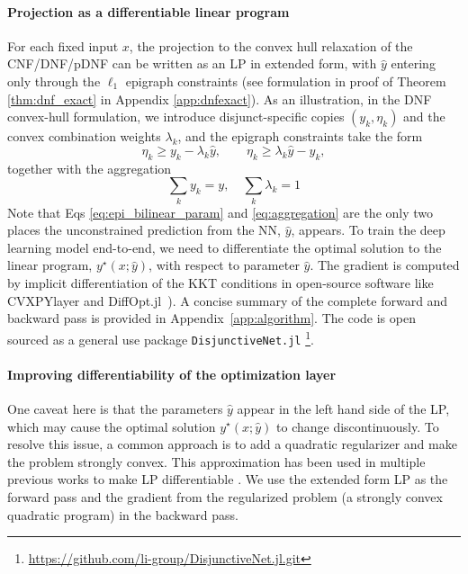 \documentclass{article}
\theoremstyle{plain}
\theoremstyle{definition}
\theoremstyle{remark}
\begin{document}
\paragraph{Projection as a differentiable linear program}
For each fixed input $x$, the projection to the convex hull relaxation of the CNF/DNF/pDNF can be written as an LP in extended form, with $\hat y$ entering only through the $\ell_1$ epigraph constraints (see formulation in proof of Theorem \ref{thm:dnf_exact} in Appendix \ref{app:dnfexact}). As an illustration, in the DNF convex-hull formulation, we introduce disjunct-specific copies $(y_k,\eta_k)$ and the convex combination weights $\lambda_k$, and the epigraph constraints take the form
\begin{equation}
\eta_k \ge y_k - \lambda_k \hat y,\qquad
\eta_k \ge \lambda_k \hat y - y_k,
\label{eq:epi_bilinear_param}
\end{equation}
together with the aggregation 
\begin{equation}\label{eq:aggregation}
    \sum_k y_k=y, \quad \sum_k \lambda_k=1
\end{equation}
Note that Eqs \eqref{eq:epi_bilinear_param} and \eqref{eq:aggregation} are the only two places the unconstrained prediction from the NN, $\hat{y}$, appears.  To train the deep learning model end-to-end, we need to differentiate the optimal solution to the linear program, $y^\star(x;\hat y)$,  with respect to parameter $\hat y$. The gradient is computed by implicit differentiation of the KKT conditions in open-source software like CVXPYlayer \cite{agrawal2019differentiable} and  DiffOpt.jl~\cite{besancon2023diffopt}). A concise summary of the complete forward and backward pass is provided in Appendix~\ref{app:algorithm}. The code is open sourced as a general use package \texttt{DisjunctiveNet.jl} \footnote{\url{https://github.com/li-group/DisjunctiveNet.jl.git}}.



\paragraph{Improving differentiability of the optimization layer}  One caveat here is that the parameters $\hat{y}$ appear in the left hand side of the LP, which may cause the optimal solution $y^\star(x;\hat y)$ to change discontinuously. To resolve this issue, a common approach is to add a quadratic regularizer and make the problem strongly convex. This approximation has been used in multiple previous works to make LP differentiable \cite{sadana2025survey}. We use the extended form LP as the forward pass and the gradient from the regularized problem (a strongly convex quadratic program) in the backward pass.
\end{document}
